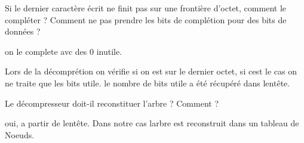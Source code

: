 \begin{DoxyItemize}
\begin{DoxyItemize}
\end{DoxyItemize}
\item Si le dernier caractère écrit ne finit pas sur une frontière d’octet, comment le compléter ? Comment ne pas prendre les bits de complétion pour des bits de données ?
\begin{DoxyItemize}
\item on le complete avc des 0 inutile.
\item Lors de la décomprétion on vérifie si on est sur le dernier octet, si c\textquotesingle{}est le cas on ne traite que les bits utile. le nombre de bits utile a été récupéré dans l\textquotesingle{}entête.
\end{DoxyItemize}
\item Le décompresseur doit-\/il reconstituer l’arbre ? Comment ?
\begin{DoxyItemize}
\item oui, a partir de l\textquotesingle{}entête. Dans notre cas l\textquotesingle{}arbre est reconstruit dans un tableau de {\ttfamily Noeuds}. 
\end{DoxyItemize}
\end{DoxyItemize}